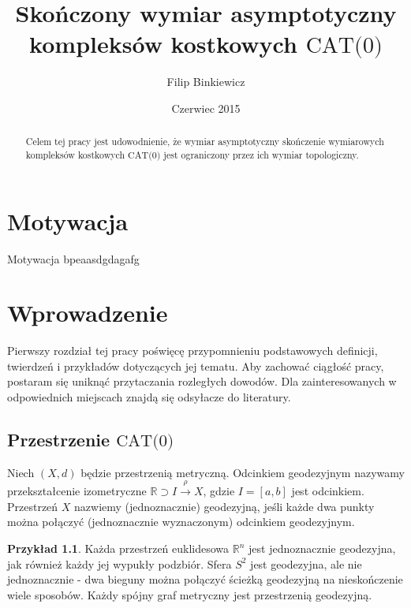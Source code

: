 \documentclass[licencjacka]{pracamgr}
\author{Filip Binkiewicz}
\title{Skończony wymiar asymptotyczny kompleksów kostkowych $\text{CAT(0)}$}
\date{Czerwiec 2015}
\theoremstyle{definition}
\theoremstyle{definition}
\theoremstyle{definition}
\newtheorem{example}{Przykład}[section]
\theoremstyle{plain}
\theoremstyle{plain}
\begin{document}
\maketitle


\begin{abstract}
	Celem tej pracy jest udowodnienie, że wymiar asymptotyczny skończenie 
	wymiarowych kompleksów kostkowych $\text{CAT(0)}$ jest ograniczony 
	przez ich wymiar topologiczny.
\end{abstract}

\tableofcontents

\chapter*{Motywacja}

Motywacja bpeaasdgdagafg

\chapter{Wprowadzenie}

Pierwszy rozdział tej pracy poświęcę przypomnieniu podstawowych definicji, 
twierdzeń i przykładów dotyczących jej tematu. Aby zachować ciągłość pracy, 
postaram się uniknąć przytaczania rozległych dowodów. Dla zainteresowanych 
w odpowiednich miejscach znajdą się odsyłacze do literatury.

\section{Przestrzenie $\text{CAT(0)}$}
Niech $ (X, d) $ będzie przestrzenią metryczną. Odcinkiem geodezyjnym nazywamy 
przekształcenie izometryczne $ \mathbb{R} \supset I \xrightarrow{\rho} X $, gdzie 
$ I =[a,b]$ jest odcinkiem. Przestrzeń $ X $ nazwiemy (jednoznacznie) geodezyjną, 
jeśli każde dwa punkty można połączyć (jednoznacznie wyznaczonym) odcinkiem 
geodezyjnym.

\begin{example}
	Każda przestrzeń euklidesowa $ \mathbb{R}^n $ jest jednoznacznie geodezyjna, 
	jak również każdy jej wypukły podzbiór. Sfera $ S^2 $ jest geodezyjna, ale 
	nie jednoznacznie - dwa bieguny można połączyć ścieżką geodezyjną na 
	nieskończenie wiele sposobów. Każdy spójny graf metryczny jest przestrzenią 
	geodezyjną.
\end{example}
\end{document}
